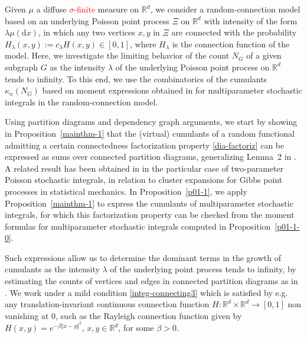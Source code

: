 \documentclass[bj,authoryear,noshowframe]{imsart}
\theoremstyle{plain}
\theoremstyle{remark}
\newcommand{\R}{\mathbb{R}}
\def\real{{\mathord{\mathbb R}}}
\begin{document}
Given $\mu$ a %
diffuse \textcolor{red}{$\sigma$-finite} measure on $\R^d$,
 we consider a random-connection model
 based on an underlying Poisson point process $\Xi$ on $\R^d$
 with intensity of the form $\lambda\mu(\mathrm{d}x)$, in which 
 any two vertices $x,y$ in $\Xi$ are connected
 with the probability $H_\lambda(x,y):= c_\lambda H(x,y) \in [0,1]$,
 where $H_\lambda$ is the connection function of the model. 
 Here, we investigate the limiting behavior
 of the count $N_G$ of a given subgraph $G$
 as the intensity $\lambda$ of the underlying Poisson point process on $\R^d$
 tends to infinity. 
 To this end, we use the combinatorics of the cumulants $\kappa_n(N_G)$ 
 based on moment expressions obtained in \cite{prkhp} for
 multiparameter stochastic integrals in the random-connection model.

Using partition diagrams and dependency graph arguments,
we start by showing in Proposition~\ref{mainthm-1}
that the (virtual) cumulants of a random functional admitting
a certain connectedness factorization property \eqref{dia-factoriz}  
can be expressed as sums over connected partition diagrams, 
 generalizing Lemma~2 in \cite{MalyshevMinlos91}.  
 A related result has been obtained in \cite{jansen}
 in the particular case of two-parameter Poisson stochastic
 integrals, in relation to 
 cluster expansions for Gibbs point processes in statistical
 mechanics. 
 In Proposition~\ref{p01-1}, we apply Proposition~\ref{mainthm-1} 
 to express the cumulants of multiparameter stochastic integrals,
 for which this factorization property can be checked from 
 the moment formulas for 
 multiparameter stochastic integrals computed in Proposition~\ref{p01-1-0}. 
 
 Such expressions allow us to determine the dominant terms in the growth of
 cumulants as the intensity $\lambda$ of the underlying point process tends to infinity,
 by estimating the counts of vertices and edges in connected partition diagrams
 as in \cite{khorunzhiy}. 
 We work under a mild condition \eqref{integ-connecting3} 
 which is satisfied by e.g. any translation-invariant
 continuous connection function $H : \real^d\times \real^d \to [0,1]$ non vanishing at $0$, such as the {Rayleigh} connection function
  given by $H(x,y) = e^{ - \beta \Vert x - y\Vert^2}$, $x,y\in \real^d$, for some $\beta > 0$. 
 
\end{document}
